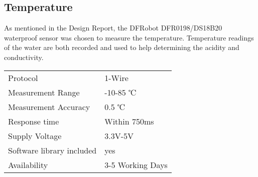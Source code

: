 \subsection{Temperature}
As mentioned in the Design Report, the DFRobot DFR0198/DS18B20 \cite{DFR0198} waterproof sensor was chosen to measure the temperature. Temperature readings of the water are both recorded and used to help determining the acidity and conductivity.

\begin{table}[h!]
	\centering
	\quad
	\begin{tabular}{| l | l |}
    \hline
    Protocol & 1-Wire\\
    Measurement Range & -10-85 ℃ \\
    Measurement Accuracy &  0.5 ℃ \\
    Response time & Within 750ms \\
    Supply Voltage & 3.3V-5V \\
    Software library included & yes \\
    Availability & 3-5 Working Days \\
    \hline
	\end{tabular}
\end{table}
